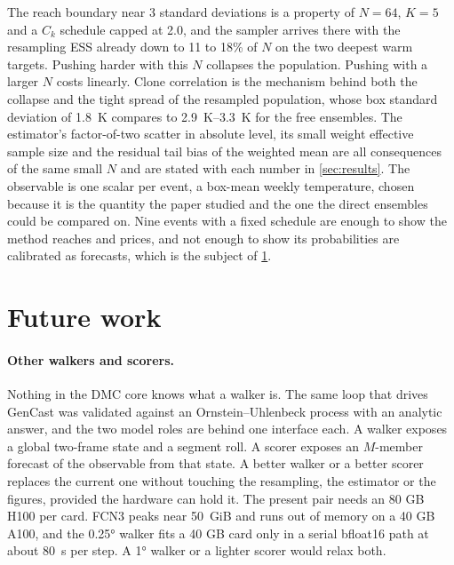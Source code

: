 \documentclass[10pt,twocolumn]{article}
\newcommand{\ck}{C_k}
\begin{document}
The reach boundary near 3 standard deviations is a property of $N = 64$, $K = 5$ and a $\ck$ schedule capped at 2.0, and the sampler arrives there with the resampling ESS already down to 11 to 18\% of $N$ on the two deepest warm targets. Pushing harder with this $N$ collapses the population. Pushing with a larger $N$ costs linearly. Clone correlation is the mechanism behind both the collapse and the tight spread of the resampled population, whose box standard deviation of \SI{1.8}{K} compares to \SIrange{2.9}{3.3}{K} for the free ensembles. The estimator's factor-of-two scatter in absolute level, its small weight effective sample size and the residual tail bias of the weighted mean are all consequences of the same small $N$ and are stated with each number in \cref{sec:results}. The observable is one scalar per event, a box-mean weekly temperature, chosen because it is the quantity the paper studied and the one the direct ensembles could be compared on. Nine events with a fixed schedule are enough to show the method reaches and prices, and not enough to show its probabilities are calibrated as forecasts, which is the subject of \cref{sec:future}.

\section{Future work}
\label{sec:future}

\paragraph{Other walkers and scorers.}
Nothing in the DMC core knows what a walker is. The same loop that drives GenCast was validated against an Ornstein--Uhlenbeck process with an analytic answer, and the two model roles are behind one interface each. A walker exposes a global two-frame state and a segment roll. A scorer exposes an $M$-member forecast of the observable from that state. A better walker or a better scorer replaces the current one without touching the resampling, the estimator or the figures, provided the hardware can hold it. The present pair needs an 80 GB H100 per card. FCN3 peaks near \SI{50}{GiB} and runs out of memory on a 40 GB A100, and the 0.25\si{\degree} walker fits a 40 GB card only in a serial bfloat16 path at about \SI{80}{s} per step. A 1\si{\degree} walker or a lighter scorer would relax both.
\end{document}
